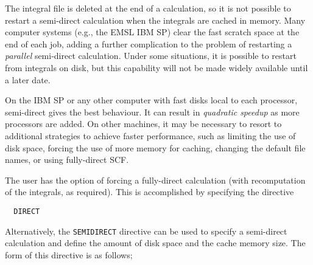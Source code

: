 The integral file is deleted at the end of a calculation, so it is not
possible to restart a semi-direct calculation when the integrals are
cached in memory.  Many computer systems (e.g., the EMSL IBM SP) clear
the fast scratch space at the end of each job, adding a further complication
to the problem of restarting a {\em parallel} semi-direct calculation.
Under some situations, it is possible to restart from integrals on disk,
but this capability will not be made widely available until a later date.


On the IBM SP or any other computer with fast disks local to each
processor, semi-direct gives the best behaviour.  It can result in {\em
  quadratic speedup} as more processors are added.  On other machines,
it may be necessary to resort to additional strategies to achieve faster
performance, such as limiting the use of disk space, forcing the use of
more memory for caching, changing the default file names, or  using
fully-direct SCF.

The user has the option of forcing a fully-direct calculation (with
recomputation of the integrals, as required).  This is accomplished
by specifying the directive

\begin{verbatim}
  DIRECT
\end{verbatim}

Alternatively, the \verb+SEMIDIRECT+ directive can be used to
specify a semi-direct calculation and define
the amount of disk space and the cache memory size.  The form of this
directive is as follows;

